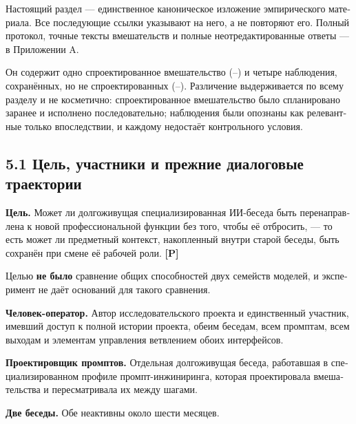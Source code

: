 \begin{russian}
Настоящий раздел — единственное каноническое изложение эмпирического материала. Все последующие ссылки указывают на него, а не повторяют его. Полный протокол, точные тексты вмешательств и полные неотредактированные ответы — в Приложении A.

Он содержит одно спроектированное вмешательство (–) и четыре наблюдения, сохранённых, но не спроектированных (–). Различение выдерживается по всему разделу и не косметично: спроектированное вмешательство было спланировано заранее и исполнено последовательно; наблюдения были опознаны как релевантные только впоследствии, и каждому недостаёт контрольного условия.


\subsection*{5.1 Цель, участники и прежние диалоговые траектории}
\label{sec:ru:5.1}

\textbf{Цель.} Может ли долгоживущая специализированная ИИ-беседа быть перенаправлена к новой профессиональной функции без того, чтобы её отбросить, — то есть может ли предметный контекст, накопленный внутри старой беседы, быть сохранён при смене её рабочей роли. \textbf{[P]}

Целью \textbf{не было} сравнение общих способностей двух семейств моделей, и эксперимент не даёт оснований для такого сравнения.

\textbf{Человек-оператор.} Автор исследовательского проекта и единственный участник, имевший доступ к полной истории проекта, обеим беседам, всем промптам, всем выходам и элементам управления ветвлением обоих интерфейсов.

\textbf{Проектировщик промптов.} Отдельная долгоживущая беседа, работавшая в специализированном профиле промпт-инжиниринга, которая проектировала вмешательства и пересматривала их между шагами.

\textbf{Две беседы.} Обе неактивны около шести месяцев.


\end{russian}
